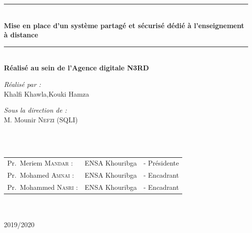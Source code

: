 \begin{titlepage}
\begin{center}
\rule{\linewidth}{0.3mm} \\[0.4cm]
{ \huge \bfseries\color{blue!70!black} Mise en place d'un système partagé et sécurisé
	dédié à l’enseignement à distance \\[0.4cm] }
\rule{\linewidth}{0.3mm} \\[0.4cm]
{\large \bfseries Réalisé au sein de l'Agence digitale N3RD}\\[0.5cm]
 \noindent
\begin{minipage}{0.4\textwidth}
  \begin{flushleft} \large
    \emph{\color{orange!80!black}Réalisé par :}\\
    Khalfi Khawla,Kouki Hamza \\
  \end{flushleft}
\end{minipage}%
\begin{minipage}{0.5\textwidth}
  \begin{flushright} \large
    \emph{\color{orange!80!black}Sous la direction de :} \\
    M. Mounir \textsc{Nefzi} (SQLI)\\
  \end{flushright}
\end{minipage}\\[1.5cm]




\\[0.5cm]

\color{black}
\centering
\begin{tabular}{lll}
\large Pr.~Meriem \textsc{Mandar} : & \large ENSA Khouribga & \large - Présidente \\[0.1cm]
\large Pr.~Mohamed \textsc{Amnai} : & \large ENSA Khouribga & \large - Encadrant \\[0.1cm]
\large Pr.~Mohammed \textsc{Nasri} : & \large ENSA Khouribga & \large - Encadrant
\end{tabular}\\[1.6cm]

{\large \color{orange!80!black}{Année universitaire}\\ \color{blue!80!black}2019/2020}

\end{center}
\end{titlepage}
